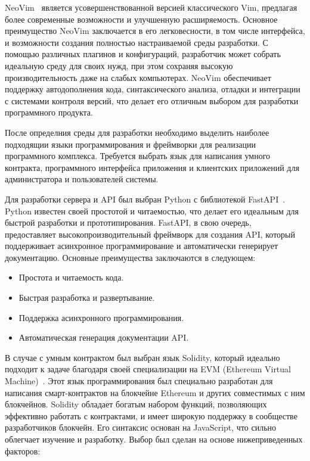 NeoVim~\cite{bib:neovim} является усовершенствованной версией классического Vim, предлагая более современные возможности и улучшенную расширяемость. Основное преимущество NeoVim заключается в его легковесности, в том числе интерфейса, и возможности создания полностью настраиваемой среды разработки. С помощью различных плагинов и конфигураций, разработчик может собрать идеальную среду для своих нужд, при этом сохраняя высокую производительность даже на слабых компьютерах. NeoVim обеспечивает поддержку автодополнения кода, синтаксического анализа, отладки и интеграции с системами контроля версий, что делает его отличным выбором для разработки программного продукта.

После определния среды для разработки необходимо выделить наиболее подходящии языки программирования и фреймворки для реализации программного комплекса. Требуется выбрать язык для написания умного контракта, программного интерфейса приложения и клиентских приложений для администратора и пользователей системы.

Для разработки сервера и API был выбран Python с библиотекой FastAPI~\cite{bib:fastapi}. Python известен своей простотой и читаемостью, что делает его идеальным для быстрой разработки и прототипирования. FastAPI, в свою очередь, предоставляет высокопроизводительный фреймворк для создания API, который поддерживает асинхронное программирование и автоматически генерирует документацию. Основные преимущества заключаются в следующем:

\begin{itemize}
    \item Простота и читаемость кода.
    \item Быстрая разработка и развертывание.
    \item Поддержка асинхронного программирования.
    \item Автоматическая генерация документации API.
\end{itemize}

В случае с умным контрактом был выбран язык Solidity, который идеально подходит к задаче благодаря своей специализации на EVM (Ethereum Virtual Machine)~\cite{bib:evm}. Этот язык программирования был специально разработан для написания смарт-контрактов на блокчейне Ethereum и других совместимых с ним блокчейнов. Solidity обладает богатым набором функций, позволяющих эффективно работать с контрактами, и имеет широкую поддержку в сообществе разработчиков блокчейн. Его синтаксис основан на JavaScript, что сильно облегчает изучение и разработку. Выбор был сделан на основе нижеприведенных факторов:

